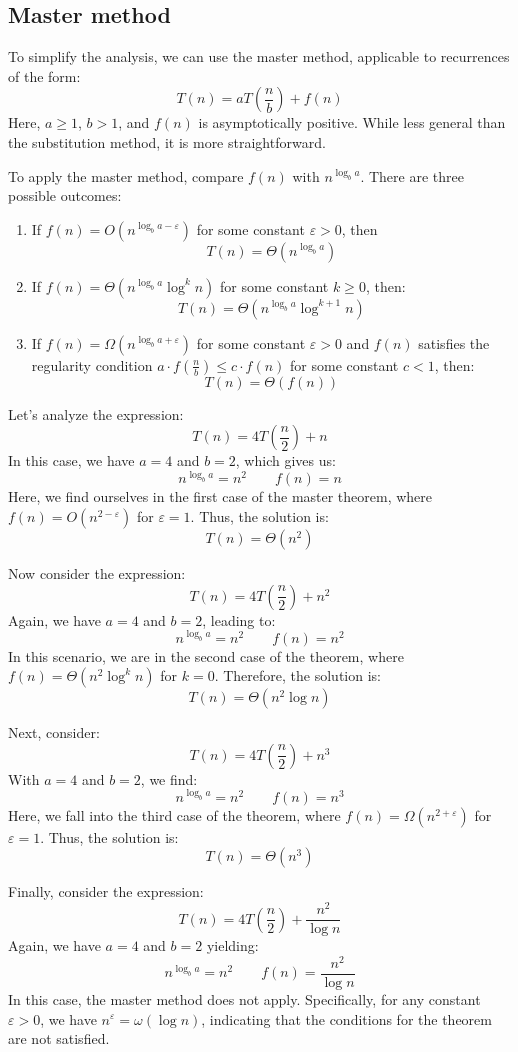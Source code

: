 \subsection{Master method}
To simplify the analysis, we can use the master method, applicable to recurrences of the form:
\[T(n)=aT\left(\frac{n}{b}\right)+f(n)\]
Here, $a\geq 1$, $b>1$, and $f(n)$ is asymptotically positive. 
While less general than the substitution method, it is more straightforward.

To apply the master method, compare $f(n)$ with $n^{\log_ba}$. 
There are three possible outcomes:
\begin{enumerate}
    \item If $f(n)=O(n^{\log_ba-\varepsilon})$ for some constant $\varepsilon > 0$, then
        \[T(n)=\Theta(n^{\log_ba})\]
    \item If $f(n)=\Theta(n^{\log_ba}\log^kn)$ for some constant $k \geq 0$, then: 
        \[T(n)=\Theta(n^{\log_ba}\log^{k+1}n)\]
    \item If $f(n)=\Omega(n^{\log_ba+\varepsilon})$ for some constant $\varepsilon > 0$ and $f(n)$ satisfies the regularity condition $a \cdot f\left(\frac{n}{b}\right) \leq c \cdot f(n)$ for some constant $c < 1$, then:
        \[T(n)=\Theta(f(n))\]
\end{enumerate}
\begin{example}
    Let's analyze the expression:
    \[T(n)=4T\left(\frac{n}{2}\right)+n\]
    In this case, we have $a=4$ and $b=2$, which gives us:
    \[n^{\log_ba}=n^2 \qquad f(n)=n\]
    Here, we find ourselves in the first case of the master theorem, where $f(n)=O(n^{2-\varepsilon})$ for $\varepsilon=1$. 
    Thus, the solution is:
    \[T(n)=\Theta(n^2)\]

    Now consider the expression:
    \[T(n)=4T\left(\frac{n}{2}\right)+n^2\]
    Again, we have $a=4$ and $b=2$, leading to:
    \[n^{\log_ba}=n^2 \qquad f(n)=n^2\]
    In this scenario, we are in the second case of the theorem, where $f(n)=\Theta(n^2\log^kn)$ for $k=0$. 
    Therefore, the solution is:
    \[T(n)=\Theta(n^2\log n)\]

    Next, consider:
    \[T(n)=4T\left(\frac{n}{2}\right)+n^3\]
    With $a=4$ and $b=2$, we find:
    \[n^{\log_ba}=n^2 \qquad f(n)=n^3\]
    Here, we fall into the third case of the theorem, where $f(n)=\Omega(n^{2+\varepsilon})$ for $\varepsilon=1$. 
    Thus, the solution is:
    \[T(n)=\Theta(n^3)\]

    Finally, consider the expression:
    \[T(n)=4T\left(\frac{n}{2}\right)+\frac{n^2}{\log n}\]
    Again, we have $a=4$ and $b=2$ yielding:
    \[n^{\log_ba}=n^2 \qquad f(n)=\frac{n^2}{\log n}\]
    In this case, the master method does not apply. 
    Specifically, for any constant $\varepsilon > 0$, we have $n^\varepsilon = \omega(\log n)$, indicating that the conditions for the theorem are not satisfied.
\end{example}